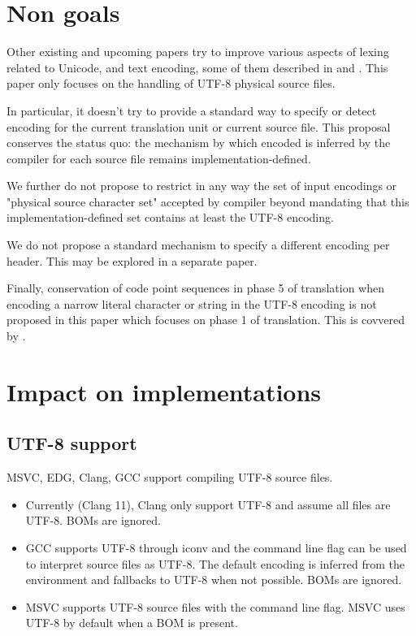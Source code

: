 \documentclass{wg21}
\begin{document}
\section{Non goals}

Other existing and upcoming papers try to improve various aspects of lexing related to Unicode, and text encoding, some of them described in 
and .
This paper only focuses on the handling of UTF-8 physical source files.

In particular, it doesn't try to provide a standard  way to specify or detect encoding for the current translation unit or current source file. This proposal conserves the status quo: the mechanism by which encoded is inferred by the compiler for each source file remains implementation-defined.

We further do not propose to restrict in any way the set of input encodings or "physical source character set"
accepted by compiler beyond mandating that this implementation-defined set contains at least the UTF-8 encoding.

We do not propose a standard mechanism to specify a different encoding per header. This may be explored in a separate paper.

Finally, conservation of code point sequences in phase 5 of translation when encoding a narrow literal character or string in the UTF-8
encoding is not proposed in this paper which focuses on phase 1 of translation.
This is covvered by .




\section{Impact on implementations}

\subsection{UTF-8 support}
MSVC, EDG, Clang, GCC support compiling UTF-8 source files.

\begin{itemize}
\item Currently (Clang 11), Clang only support UTF-8 and assume all files are UTF-8. BOMs are ignored.
\item GCC supports UTF-8 through iconv and the command line flag  can be used to interpret source files as UTF-8.
The default encoding is inferred from the environment and fallbacks to UTF-8 when not possible. BOMs are ignored.
\item MSVC supports UTF-8 source files with the  command line flag. MSVC uses UTF-8 by default when a BOM is present.
\end{itemize}
\end{document}
